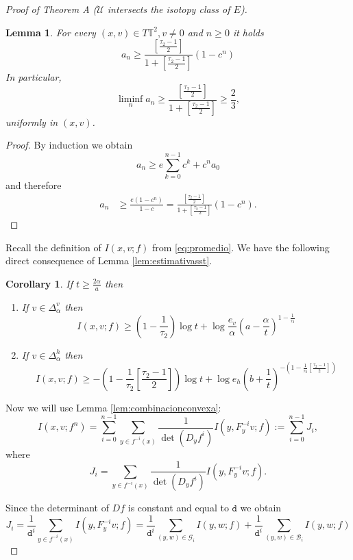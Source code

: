 \documentclass[11pt,letterpaper,reqno]{article}
\newtheorem{lemma}{Lemma}[section]
\newtheorem{corollary}{Corollary}[section]
\newcommand{\Tor}{\mathbb{T}^2}
\newcommand{\Deh}{\Delta_{\alpha}^h}
\newcommand{\Dev}{\Delta_{\alpha}^v}
\begin{document}
\begin{proof}[Proof of Theorem A ($\mathcal U$ intersects the isotopy class of $E$)]
\begin{lemma}\label{lem:proporcion}
For every $(x,v)\in T\Tor, v\neq 0$ and $n\geq 0$ it holds
\[
	a_n\geq \frac{\left[\frac{\tau_2-1}2\right]}{1+\left[\frac{\tau_2-1}2\right]}(1-c^n)
\]
In particular, 
\[
\liminf_n a_n\geq \frac{\left[\frac{\tau_2-1}2\right]}{1+\left[\frac{\tau_2-1}2\right]}\geq\frac{2}{3},
\]
uniformly in $(x,v)$.
\end{lemma} 

\begin{proof}
By induction we obtain
\[
a_{n}\geq e\sum_{k=0}^{n-1}c^k+c^{n}a_0
\]
and therefore 
\begin{align*}
a_n&\geq\frac {e(1-c^n)}{1-c}=\frac{\left[\frac{\tau_2-1}2\right]}{1+\left[\frac{\tau_2-1}2\right]}(1-c^n).
\end{align*}
\end{proof}



Recall the definition of $I(x,v;f)$ from \eqref{eq:promedio}. We have the following direct consequence of Lemma \ref{lem:estimativasst}.
\begin{corollary}\label{cor:estimativasst}
If $t\geq\frac{2\alpha}a$ then
\begin{enumerate}
	\item If $v\in\Dev$ then
	\[
	I(x,v;f)\geq \left(1-\frac{1}{\tau_2}\right)\log t+\log \frac{e_v}{\alpha} \left(a-\frac{\alpha}t\right)^{1-\frac 1{\tau_2}}
	\]
	\item If $v\in\Deh$ then
	\[
	I(x,v;f)\geq  -\left(1-\frac1{\tau_2}\left[\frac{\tau_2-1}2\right]\right)\log t+\log e_h\left(b+\frac 1t\right)^{-\left(1-\frac 1{\tau_2}\left[\frac{\tau_2-1}2\right]\right)}
	\]
\end{enumerate}
\end{corollary}


Now we will use Lemma \ref{lem:combinacionconvexa}:
\[
I(x,v;f^n)=\sum_{i=0}^{n-1}\sum_{y\in f^{-i}(x)}\frac 1{\det(D_yf^i)}I(y,F_y^{-i}v;f):=\sum_{i=0}^{n-1}J_i,
\]
where
\[
J_i=\sum_{y\in f^{-i}(x)}\frac 1{\det(D_yf^i)}I(y,F_y^{-i}v;f).
\]

Since the determinant of $Df$ is constant and equal to $\mathtt d$ we obtain
\[
	J_i=\frac{1}{\mathtt d^i}\sum_{y\in f^{-i}(x)}I(y,F_y^{-i}v;f)=\frac{1}{\mathtt d^i}\sum_{(y,w)\in\mathcal{G}_i} I(y,w;f)+\frac{1}{\mathtt d^i}\sum_{(y,w)\in\mathcal{B}_i} I(y,w;f)
\]




\end{proof}
\end{document}
